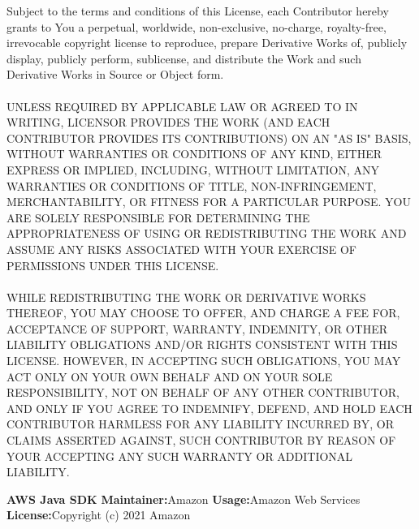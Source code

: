\begin{addmargin}[4.5em]{0em}
    \fontsize{10pt}{12pt}\selectfont
    Subject to the terms and conditions of this License, each Contributor hereby grants to
    You a perpetual, worldwide, non-exclusive, no-charge, royalty-free, irrevocable copyright
    license to reproduce, prepare Derivative Works of, publicly display, publicly perform,
    sublicense, and distribute the Work and such Derivative Works in Source or Object form.
    \\ \\
    \uppercase{Unless required by applicable law or agreed to in writing,
    Licensor provides the Work (and each Contributor provides its Contributions)
    on an "AS IS" BASIS, WITHOUT WARRANTIES OR CONDITIONS OF ANY KIND, either express
    or implied, including, without limitation, any warranties or conditions of TITLE,
    NON-INFRINGEMENT, MERCHANTABILITY, or FITNESS FOR A PARTICULAR PURPOSE. You are
    solely responsible for determining the appropriateness of using or redistributing
    the Work and assume any risks associated with Your exercise of permissions under
    this License.
    \\ \\
    While redistributing the Work or Derivative Works thereof, You may choose to offer,
    and charge a fee for, acceptance of support, warranty, indemnity, or other liability
    obligations and/or rights consistent with this License. However, in accepting such
    obligations, You may act only on Your own behalf and on Your sole responsibility,
    not on behalf of any other Contributor, and only if You agree to indemnify, defend,
    and hold each Contributor harmless for any liability incurred by, or claims asserted
    against, such Contributor by reason of your accepting any such warranty or additional
    liability.}
\end{addmargin}
\newpage
{\bfseries AWS Java SDK}
\newline
\newline
{\bfseries Maintainer:}{\space Amazon}
\newline
\newline
{\bfseries Usage:}{\space Amazon Web Services}
\newline
\newline
{\bfseries License:}{\space Copyright (c) 2021 Amazon}
\newline
